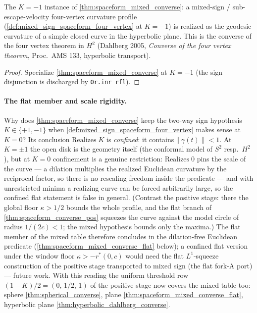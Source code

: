 \begin{theorem}
  \label{thm:hyperbolic_dahlberg_converse}
  The $K=-1$ instance of \cref{thm:spaceform_mixed_converse}: a
  mixed-sign / sub-escape-velocity four-vertex curvature profile
  (\cref{def:mixed_sign_spaceform_four_vertex} at $K=-1$) is realized
  as the geodesic curvature of a simple closed curve in the hyperbolic plane.
  This is the converse of the four vertex theorem in $H^2$ (Dahlberg 2005,
  \emph{Converse of the four vertex theorem}, Proc.\ AMS 133, hyperbolic
  transport).
\end{theorem}

\begin{proof}
  \leanok
  Specialize \cref{thm:spaceform_mixed_converse} at $K=-1$ (the sign
  disjunction is discharged by \texttt{Or.inr rfl}).
\end{proof}

\paragraph{The flat member and scale rigidity.} Why does
\cref{thm:spaceform_mixed_converse} keep the two-way sign hypothesis
$K\in\{+1,-1\}$ when \cref{def:mixed_sign_spaceform_four_vertex}
makes sense at $K=0$? Its conclusion
$\mathrm{Realizes}\;K$ is \emph{confined}: it contains$\|\gamma(t)\|<1$. At $K=\pm1$ the open disk is the geometry itself (the
conformal model of $S^2$ resp.\ $H^2$), but at $K=0$ confinement is
a genuine restriction: $\mathrm{Realizes}\;0$ pins the scale of the curve — a
dilation multiplies the realized Euclidean curvature by the reciprocal factor,
so there is no rescaling freedom inside the predicate — and with unrestricted
minima a realizing curve can be forced arbitrarily large, so the confined flat
statement is false in general. (Contrast the positive stage: there the global
floor $\kappa>1/2$ bounds the whole profile, and the flat branch of
\cref{thm:spaceform_converse_pos} squeezes the curve against the model circle
of radius $1/(2c)<1$; the mixed hypothesis bounds only the maxima.) The flat
member of the mixed table therefore concludes in the dilation-free Euclidean
predicate (\cref{thm:spaceform_mixed_converse_flat} below); a confined flat
version under the window floor $\kappa>-r^\ast(0,c)$ would need the flat
$L^1$-squeeze construction of the positive stage transported to mixed sign
(the flat fork-A port) — future work. With this reading the uniform threshold
row $(1-K)/2=(0,\,1/2,\,1)$ of the positive stage now covers the
mixed table too: sphere \cref{thm:spherical_converse}, plane
\cref{thm:spaceform_mixed_converse_flat}, hyperbolic plane
\cref{thm:hyperbolic_dahlberg_converse}.

